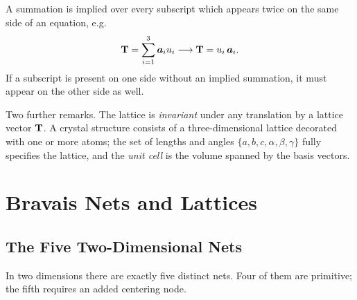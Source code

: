\begin{fact}
A summation is implied over every subscript which appears twice on the same side of an equation, e.g.
\begin{equation}
    \cvect{T} = \sum_{i=1}^{3}\lvect{a}_i u_i \longrightarrow \cvect{T} = u_i\,\lvect{a}_i .
\end{equation}
If a subscript is present on one side without an implied summation, it must appear on the other side as well.
\end{fact}

Two further remarks. The lattice is \emph{invariant} under any translation by a lattice vector $\cvect{T}$. A crystal structure consists of a three-dimensional lattice decorated with one or more atoms; the set of lengths and angles $\{a,b,c,\alpha,\beta,\gamma\}$ fully specifies the lattice, and the \emph{unit cell} is the volume spanned by the basis vectors.


\section{Bravais Nets and Lattices}

\subsection{The Five Two-Dimensional Nets}
\label{sec:xrd-2dnets}

In two dimensions there are exactly five distinct nets. Four of them are primitive; the fifth requires an added centering node.

